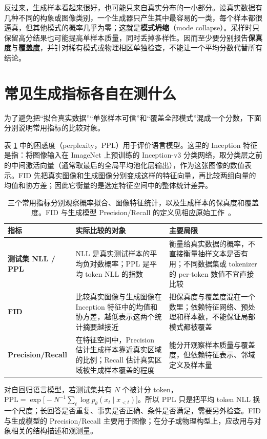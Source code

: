 反过来，生成样本看起来很好，也可能只来自真实分布的一小部分。设真实数据有几种不同的构象或图像类别，一个生成器只产生其中最容易的一类，每个样本都很逼真，但其他模式的概率几乎为零；这就是\textbf{模式坍缩}（mode collapse）。采样时只保留高分结果也可能提高单样本质量，同时丢掉多样性。因而至少要分别报告\textbf{保真度}与\textbf{覆盖度}，并针对稀有模式或物理相区单独检查，不能让一个平均分数代替所有结论。

\section{常见生成指标各自在测什么}

为了避免把“拟合真实数据”“单张样本可信”和“覆盖全部模式”混成一个分数，下面分别说明常用指标的比较对象。

表 \ref{tab:generation-metrics} 中的困惑度（perplexity，PPL）用于评价语言模型。这里的 Inception 特征是指：将图像输入在 ImageNet 上预训练的 Inception-v3 分类网络，取分类层之前的中间激活向量（通常取最后的全局平均池化层输出），作为这张图像的数值表示。FID 先把真实图像和生成图像分别变成这样的特征向量，再比较两组向量的均值和协方差；因此它衡量的是选定特征空间中的整体统计差异。

\begin{table}[ht]
\centering\small
\begin{tabularx}{\textwidth}{>{\bfseries}p{34mm} X X}
\toprule
指标 & 实际比较的对象 & 主要局限\\
\midrule
测试集 NLL / PPL & NLL 是真实测试样本的平均负对数概率；PPL 是平均 token NLL 的指数 & 衡量给真实数据的概率，不直接衡量抽样文本是否有用；不同数据集或 tokenizer 的 per-token 数值不宜直接比较\\
FID & 比较真实图像与生成图像在 Inception 特征中的均值和协方差，越低表示这两个统计摘要越接近 & 把保真度与覆盖度混在一个数里；依赖特征网络、预处理和样本数，不能保证局部模式都被覆盖\\
Precision/Recall & 在特征空间中，Precision 估计生成样本靠近真实区域的比例；Recall 估计真实区域被生成样本覆盖的程度 & 能分开观察样本质量与覆盖度，但依赖特征表示、邻域定义及样本量\\
\bottomrule
\end{tabularx}
\caption{三个常用指标分别观察概率拟合、图像特征统计，以及生成样本的保真度和覆盖度。FID 与生成模型 Precision/Recall 的定义见相应原始工作~\cite{heusel2017fid,kynkaanniemi2019precisionrecall}。}
\label{tab:generation-metrics}
\end{table}

对自回归语言模型，若测试集共有 \(N\) 个被计分 token，\(\mathrm{PPL}=\exp\!\bigl[-N^{-1}\sum_t\log p_\theta(x_t\mid x_{<t})\bigr]\)。所以 PPL 只是把平均 token NLL 换一个尺度；长回答是否重复、事实是否正确、条件是否满足，需要另外检查。FID 与生成模型的 Precision/Recall 主要用于图像；在分子或物理构型上，应改用与对象相关的结构描述和观测量。

